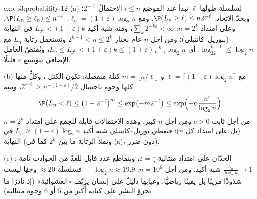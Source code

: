 \begin{solution}{exo:b3:probability:12}
(a) لسلسلة طولها $\ell$ تبدأ عند الموضع $i \leq n$ الاحتمالُ
$2^{-\ell}$؛ وبحدّ الاتحاد: $\P(L_n \geq \ell)
\leq n2^{-\ell}$. ومع $\ell_n = (1 +
\varepsilon)\log_2n$: $\P(L_n \geq \ell_n) \leq
n^{-\varepsilon}$. وعلى
امتداد $n = 2^k$: $\sum_k2^{-k\varepsilon} < \infty$، ومنه شبه أكيد $L_{2^k} <
(1+\varepsilon)k$ في النهاية
(ببوريل--كانتيلي)؛ ومن أجل $n$ عام نختار $2^{k-1} < n \leq 2^k$ ونستعمل رتابة
$L_n$ مع $\log_22^{k-1} \leq \log_2n$: أي $L_n \leq L_{2^k}
< (1 + \varepsilon)k \leq (1 + \varepsilon)\frac{k}{k-1}
\log_2n$، ويُمتصّ العامل الإضافي بتوسيع
$\varepsilon$ قليلًا.

(b) مع $\ell = \lceil(1 - \varepsilon)\log_2n\rceil$ و $m = \lfloor n/\ell\rfloor$ كتلة منفصلة: تكون الكتل ، وكلٌّ
منها كلها وجوه باحتمال $2^{-\ell}
\geq n^{-(1-\varepsilon)}/2$، ومنه
\[
\P(L_n < \ell) \leq \bigl(1 - 2^{-\ell}\bigr)^{m}
\leq \exp\bigl(-m2^{-\ell}\bigr)
\leq \exp\Bigl(-c\,\frac{n^{\varepsilon}}{\log_2n}\Bigr)
\]
من أجل ثابت $c > 0$ ومن أجل $n$ كبير. وهذه الاحتمالات قابلة
للجمع على امتداد $n = 2^k$ (بل على امتداد كل $n$):
فتعطي بوريل--كانتيلي شبه أكيد $L_n \geq (1 -
\varepsilon)\log_2n$ في النهاية (وتملأ الرتابة
ما بين $2^k$ كما في (a)، دون ضرر).

(c) الحدّان على امتداد متتالية $\varepsilon = \frac1j$، وبتقاطع عدد قابل للعدّ من
الحوادث تامة : $\frac{L_n}{\log_2n} \to 1$ شبه أكيد. ومن أجل $n = 10^6$:
$\log_2n
\approx 19.9$ --- فسلسلة $\approx 20$ وجهًا ليست شذوذًا مريبًا بل يقينًا
رياضيًّا، وغيابها دليلٌ على إنسان يزيّف «العشوائية» (إذ نادرًا
ما يجرؤ البشر على كتابة أكثر من $5$ أو $6$ وجوه متتالية).
\end{solution}

